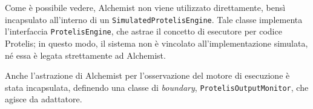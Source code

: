    Come è possibile vedere, Alchemist non viene utilizzato direttamente, bensì incapsulato all'interno di un \texttt{SimulatedProtelisEngine}.
    Tale classe implementa l'interfaccia \texttt{ProtelisEngine}, che astrae il concetto di esecutore per codice Protelis;
    in questo modo, il sistema non è vincolato all'implementazione simulata, né essa è legata strettamente ad Alchemist.

    Anche l'astrazione di Alchemist per l'osservazione del motore di esecuzione è stata incapsulata, definendo una classe di \emph{boundary}, \texttt{ProtelisOutputMonitor}, che agisce da adattatore.


